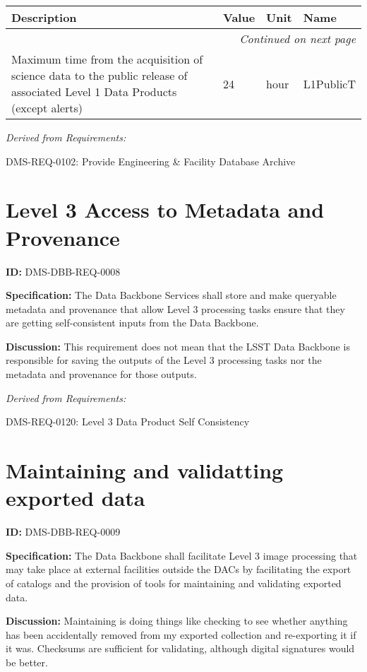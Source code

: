 \documentclass[SE,toc,lsstdraft]{lsstdoc}
\makeatletter
\newcommand{\paramname}[1]{\hspace{0pt}#1}
\newcommand{\unitname}[1]{\hspace{0pt}#1}
\newenvironment{parameters}[0]{%
\setlength\LTleft{0pt}
\setlength\LTright{\fill}
\begin{small}
\begin{longtable}[]{|p{0.49\textwidth}|l|p{0.6in}|p{1.70in}@{}|}

\hline \textbf{Description} & \textbf{Value} & \textbf{Unit} & \textbf{Name} \\ \hline
\endhead

\hline \multicolumn{4}{r}{\emph{Continued on next page}} \\
\endfoot

\hline\hline
\endlastfoot
}{%
\hline
\end{longtable}
\end{small}
}
\makeatother
\begin{document}
\begin{parameters}
Maximum time from the acquisition of science data to the public release of associated Level 1 Data Products (except alerts)
&
24
&
\unitname{%
hour
}
&
\paramname{%
L1PublicT
} \\\hline
\end{parameters}

\emph{Derived from Requirements:}

DMS-REQ-0102:
Provide Engineering \& Facility Database Archive \newline

\section{Level 3 Access to Metadata and Provenance}

\label{DMS-DBB-REQ-0008}
\textbf{ID:} DMS-DBB-REQ-0008

\textbf{Specification:}
The Data Backbone Services shall store and make queryable metadata and provenance that allow Level 3 processing tasks ensure that they are getting self-consistent inputs from the Data Backbone.

\textbf{Discussion:}
This requirement does not mean that the LSST Data Backbone is responsible for saving the outputs of the Level 3 processing tasks nor the metadata and provenance for those outputs.

\emph{Derived from Requirements:}

DMS-REQ-0120:
Level 3 Data Product Self Consistency \newline

\section{Maintaining and validatting exported data}

\label{DMS-DBB-REQ-0009}
\textbf{ID:} DMS-DBB-REQ-0009

\textbf{Specification:}
The Data Backbone shall facilitate Level 3 image processing that may take place at external facilities outside the DACs by facilitating the export of catalogs and the provision of tools for maintaining and validating exported data.

\textbf{Discussion:}
Maintaining is doing things like checking to see whether anything has been accidentally removed from my exported collection and re-exporting it if it was.  Checksums are sufficient for validating, although digital signatures would be better.
\end{document}
